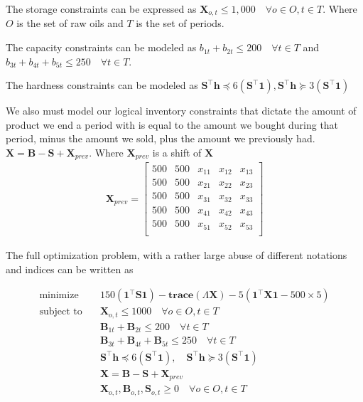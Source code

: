 The storage constraints can be expressed as $\textbf{X}_{o,t} \leq 1,000 \quad \forall o \in O, t \in T$. 
Where $O$ is the set of raw oils and $T$ is the set of periods.

The capacity constraints can be modeled as $b_{1t} + b_{2t} \leq 200 \quad \forall t \in T$ and $b_{3t} + b_{4t} + b_{5t} \leq 250 \quad \forall t \in T$.

The hardness constraints can be modeled as $\textbf{S}^\top \textbf{h} \preceq 6 (\textbf{S}^\top \textbf{1}), \textbf{S}^\top \textbf{h} \succeq 3 (\textbf{S}^\top \textbf{1}) $

We also must model our logical inventory constraints that dictate the amount of product we end a period with is equal to the amount we bought during that period, minus the amount we sold, plus the amount we previously had.
$\textbf{X} = \textbf{B} - \textbf{S} + \textbf{X}_{prev}$. Where $\textbf{X}_{prev}$ is a shift of $\textbf{X}$ 
\begin{align}
  \textbf{X}_{prev} = 
  \begin{bmatrix}
    500 & 500 & x_{11} & x_{12} & x_{13} \\
    500 & 500 & x_{21} & x_{22} & x_{23} \\
    500 & 500 & x_{31} & x_{32} & x_{33} \\
    500 & 500 & x_{41} & x_{42} & x_{43} \\
    500 & 500 & x_{51} & x_{52} & x_{53} \\
  \end{bmatrix}
\end{align}

The full optimization problem, with a rather large abuse of different notations and indices can be written as 

\begin{align}
  \text{minimize} & \quad 150(\textbf{1}^\top \textbf{S} \textbf{1}) - \textbf{trace}(\Lambda \textbf{X}) - 5(\textbf{1}^\top \textbf{X} \textbf{1} - 500 \times 5) \\
  \text{subject to} & \quad \textbf{X}_{o, t} \leq 1000 \quad \forall o \in O, t \in T \\
  & \quad \textbf{B}_{1t} + \textbf{B}_{2t} \leq 200 \quad \forall t \in T \\
  & \quad \textbf{B}_{3t} + \textbf{B}_{4t} + \textbf{B}_{5t} \leq 250 \quad \forall t \in T \\
  & \quad \textbf{S}^\top \textbf{h} \preceq 6 (\textbf{S}^\top \textbf{1}), \quad \textbf{S}^\top \textbf{h} \succeq 3 (\textbf{S}^\top \textbf{1}) \\
  & \quad \textbf{X} = \textbf{B} - \textbf{S} + \textbf{X}_{prev} \\
  & \quad \textbf{X}_{o,t}, \textbf{B}_{o,t}, \textbf{S}_{o,t} \geq 0 \quad \forall o \in O, t \in T
\end{align}


